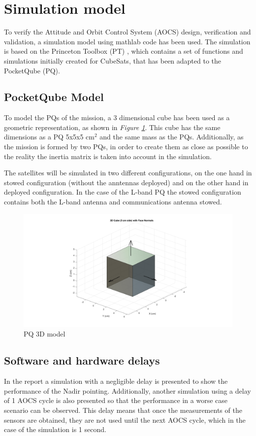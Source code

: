 
\section{Simulation model}
To verify the Attitude and Orbit Control System (AOCS) design, verification and validation, a simulation model using mathlab code has been used. The
simulation is based on the Princeton Toolbox (PT) \cite{PrincetonToolbox}, which contains a set of functions and 
simulations initially created for CubeSats, that has been adapted to the PocketQube (PQ).

\subsection{PocketQube Model}

To model the PQs of the mission, a 3 dimensional cube has
been used as a geometric representation, as shown in \textit{Figure \ref{fig:PQmodel}}. This cube has the same dimensions as a PQ 5x5x5 cm$^2$ and the same mass as the PQs. Additionally, as the mission is formed by two PQs, in order to create them as close as possible to the reality the 
inertia matrix is taken into account in the simulation.\vspace{0.2em}

\noindent The satellites will be simulated in two different configurations, on the one hand in stowed configuration (without the anntennas deployed) and on the other
hand in deployed configuration. In the case of the L-band PQ the stowed configuration contains both the L-band antenna and communications antenna
stowed.
    \begin{figure}[H]
        \centering
        \includegraphics[width=0.8\linewidth]{res/img/3_simulation_performance/PQ model.png}
        \caption{PQ 3D model}
        \label{fig:PQmodel}
    \end{figure}

\subsection{Software and hardware delays}
In the report a simulation with a negligible delay is presented to show the performance of the Nadir pointing. Additionally, another simulation using a delay of 1 AOCS cycle is also presented so that the performance in a worse case scenario can be observed. This delay means that once the measurements of the sensors are obtained, they are not used until the next AOCS cycle, which in the case of the simulation is 1 second. 


